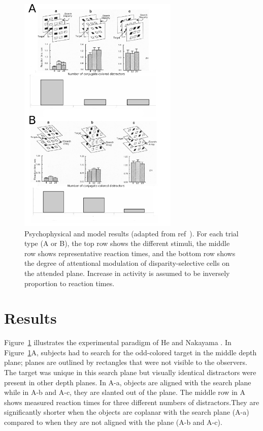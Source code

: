 \begin{figure}[t]
\centering
\includegraphics[width=3in]{3D-Surface/figs/nakayama}
\makeatletter
\let\@currsize\normalsize
\caption{Psychophysical and model results (adapted from ref~\cite{He_Nakayama95}). For each trial type (A or B), the top row shows the different stimuli, the middle row shows representative reaction times, and the bottom row shows the degree of attentional modulation of disparity-selective cells on the  attended plane. Increase in activity is assumed to be inversely proportion to reaction times.}
\label{ModelResults}
\end{figure}

\section{Results}
Figure~\ref{ModelResults} illustrates the experimental paradigm of He
and Nakayama \cite{He_Nakayama95}. In Figure~\ref{ModelResults}A, subjects had to search for the odd-colored target in the middle depth
plane; planes are outlined by rectangles that were not visible to the observers. The target was unique in this search plane but visually identical distractors  were present in other depth planes. In A-a, objects are aligned with the search plane while in A-b and A-c, they are slanted out of the plane. The middle row in A shows measured reaction times for three different numbers of distractors.They are significantly shorter when the objects are coplanar with the search plane (A-a) compared to when they are not aligned with the plane (A-b and A-c).

